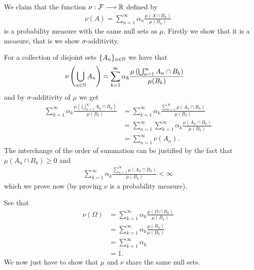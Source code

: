 \documentclass{unswmaths}
\begin{document}
We claim that the function $ \nu : \mathcal{F} \longrightarrow \mathbb{R} $ defined by
\begin{align}
	\nu(A) = \sum_{n=1}^\infty \alpha_n \frac{\mu(A \cap B_n)}{\mu(B_n)}
\end{align}
is a probability measure with the same null sets as $ \mu $.
Firstly we show that it is a measure, that is we show $\sigma$-additivity.

For a collection of disjoint sets $ \{ A_n \}_{n \in \mathbb{N}} $ we have that
\begin{align}
	\nu\left( \bigcup_{n\in\mathbb{N}} A_n \right) &= \sum_{k=1}^\infty \alpha_k \frac{\mu\left( \bigcup_{n=1}^\infty A_n \cap B_k \right)}{\mu(B_k)}
\end{align}
and by $ \sigma$-additivity of $ \mu $ we get
\begin{align}
	\sum_{k=1}^\infty \alpha_k \frac{\mu\left( \bigcup_{n=1}^\infty A_n \cap B_k \right)}{\mu(B_k)} &= \sum_{k=1}^\infty \alpha_k \frac{\sum_{n=1}^\infty \mu\left( A_n \cap B_k \right)}{\mu(B_k)} \\
	&= \sum_{n=1}^\infty  \sum_{k=1}^\infty \alpha_k \frac{\mu\left( A_n \cap B_k \right)}{\mu(B_k)} \\
	&= \sum_{n=1}^\infty \nu(A_n).
\end{align}
The interchange of the order of summation can be justified by the fact that
$ \mu(A_n \cap B_k) \geq 0 $ and 
\begin{align}
\sum_{k=1}^\infty \alpha_k \frac{\sum_{n=1}^\infty \mu\left( A_n \cap B_k \right)}{\mu(B_k)} < \infty
\end{align}
which we prove now (by proving $ \nu $ is a probability measure).

See that
\begin{align}
	\nu(\Omega) &= \sum_{k=1}^\infty \alpha_k \frac{\mu(\Omega\cap B_k)}{\mu(B_k)} \\
	&= \sum_{k=1}^\infty \alpha_k \frac{\mu( B_k)}{\mu(B_k)} \\
	&= \sum_{k=1}^\infty \alpha_k \\
	&= 1.
\end{align}
We now just have to show that $ \mu $ and $ \nu $ share the same null sets. 
\end{document}

